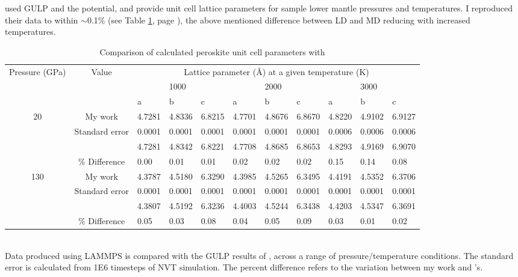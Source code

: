 	\par \citet{Ammann2014} used GULP and the \citet{Oganov2000} potential, and provide unit cell lattice parameters for sample lower mantle pressures and temperatures. I reproduced their data to within $\sim$0.1\% (see Table \ref{tab:ammann_comp}, page \pageref{tab:ammann_comp}), the above mentioned difference between LD and MD reducing with increased temperatures.

\begin{table}
  \centering
  \caption{Comparison of calculated \mgsios peroskite unit cell parameters with \cite{Ammann2014}}\vspace{2mm}
    \begin{tabular}{cc|lll|lll|lll}
    \hline
    \multirow{3}[2]{*}{Pressure (GPa)} & \multirow{3}[2]{*}{Value} & \multicolumn{9}{c}{Lattice parameter (\AA) at a given temperature (K)} \\
          &       &       & 1000  &       &       & 2000  &       &       & 3000  &  \\
          &       & a     & b     & c     & a     & b     & c     & a     & b     & c \\ \hline
    \multirow{4}[2]{*}{20} & My work & 4.7281 & 4.8336 & 6.8215 & 4.7701 & 4.8676 & 6.8670 & 4.8220 & 4.9102 & 6.9127 \\
          & Standard error & 0.0001 & 0.0001 & 0.0001 & 0.0001 & 0.0001 & 0.0001 & 0.0006 & 0.0006 & 0.0006 \\
          & \citeauthor{Ammann2014} & 4.7281 & 4.8342 & 6.8221 & 4.7708 & 4.8685 & 6.8653 & 4.8293 & 4.9169 & 6.9070 \\
          & \% Difference & 0.00  & 0.01  & 0.01  & 0.02  & 0.02  & 0.02  & 0.15  & 0.14  & 0.08 \\ \hline
    \multirow{4}[2]{*}{130} & My work & 4.3787 & 4.5180 & 6.3290 & 4.3985 & 4.5265 & 6.3495 & 4.4191 & 4.5352 & 6.3706 \\
          & Standard error & 0.0001 & 0.0001 & 0.0001 & 0.0001 & 0.0001 & 0.0001 & 0.0001 & 0.0001 & 0.0001 \\
          & \citeauthor{Ammann2014} & 4.3807 & 4.5192 & 6.3236 & 4.4003 & 4.5244 & 6.3438 & 4.4203 & 4.5347 & 6.3691 \\
          & \% Difference & 0.05  & 0.03  & 0.08  & 0.04  & 0.05  & 0.09  & 0.03  & 0.01  & 0.02 \\
    \hline
    \end{tabular} 
\\ \vspace{2mm}
Data produced using LAMMPS is compared with the GULP results of \cite{Ammann2014}, across a range of pressure/temperature conditions. The standard error is calculated from 1E6 timesteps of NVT simulation. The percent difference refers to the variation between my work and \citeauthor{Ammann2014}'s. 
  \label{tab:ammann_comp}%
\end{table}%








